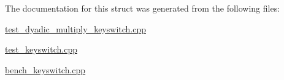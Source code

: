The documentation for this struct was generated from the following files\-:\begin{DoxyCompactItemize}
\item 
\hyperlink{test__dyadic__multiply__keyswitch_8cpp}{test\-\_\-dyadic\-\_\-multiply\-\_\-keyswitch.\-cpp}\item 
\hyperlink{test__keyswitch_8cpp}{test\-\_\-keyswitch.\-cpp}\item 
\hyperlink{bench__keyswitch_8cpp}{bench\-\_\-keyswitch.\-cpp}\end{DoxyCompactItemize}
